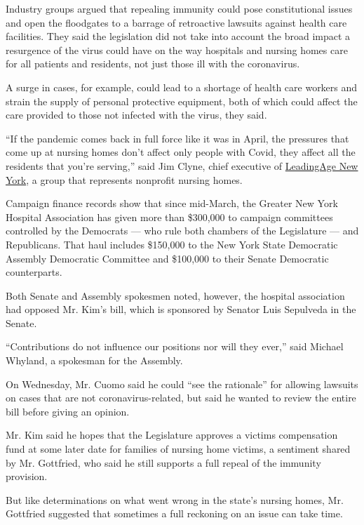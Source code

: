 Industry groups argued that repealing immunity could pose constitutional
issues and open the floodgates to a barrage of retroactive lawsuits
against health care facilities. They said the legislation did not take
into account the broad impact a resurgence of the virus could have on
the way hospitals and nursing homes care for all patients and residents,
not just those ill with the coronavirus.

A surge in cases, for example, could lead to a shortage of health care
workers and strain the supply of personal protective equipment, both of
which could affect the care provided to those not infected with the
virus, they said.

``If the pandemic comes back in full force like it was in April, the
pressures that come up at nursing homes don't affect only people with
Covid, they affect all the residents that you're serving,'' said Jim
Clyne, chief executive of
\href{https://www.leadingageny.org/}{LeadingAge New York}, a group that
represents nonprofit nursing homes.

Campaign finance records show that since mid-March, the Greater New York
Hospital Association has given more than \$300,000 to campaign
committees controlled by the Democrats --- who rule both chambers of the
Legislature --- and Republicans. That haul includes \$150,000 to the New
York State Democratic Assembly Democratic Committee and \$100,000 to
their Senate Democratic counterparts.

Both Senate and Assembly spokesmen noted, however, the hospital
association had opposed Mr. Kim's bill, which is sponsored by Senator
Luis Sepulveda in the Senate.

``Contributions do not influence our positions nor will they ever,''
said Michael Whyland, a spokesman for the Assembly.

On Wednesday, Mr. Cuomo said he could ``see the rationale'' for allowing
lawsuits on cases that are not coronavirus-related, but said he wanted
to review the entire bill before giving an opinion.

Mr. Kim said he hopes that the Legislature approves a victims
compensation fund at some later date for families of nursing home
victims, a sentiment shared by Mr. Gottfried, who said he still supports
a full repeal of the immunity provision.

But like determinations on what went wrong in the state's nursing homes,
Mr. Gottfried suggested that sometimes a full reckoning on an issue can
take time.

